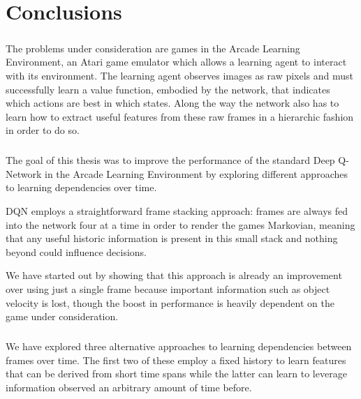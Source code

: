 \chapter{Conclusions}

\paragraph{}
The problems under consideration
are games in the Arcade Learning Environment,
an Atari game emulator
which allows a learning agent to interact
with its environment.
The learning agent observes images as raw pixels
and must successfully learn a value function,
embodied by the network,
that indicates which actions are best in which states.
Along the way the network also has to learn
how to extract useful features
from these raw frames
in a hierarchic fashion
in order to do so.

\paragraph{}
The goal of this thesis was to improve the performance
of the standard Deep Q-Network
in the Arcade Learning Environment
by exploring different approaches
to learning dependencies over time.

DQN employs a straightforward frame stacking approach:
frames are always fed into the network
four at a time
in order to render the games Markovian,
meaning that any useful historic information
is present in this small stack
and nothing beyond could influence decisions.

We have started out by showing that this approach
is already an improvement over
using just a single frame
because important information such as object velocity is lost,
though the boost in performance is heavily dependent
on the game under consideration.

\paragraph{}
We have explored three alternative approaches
to learning dependencies between frames over time.
The first two of these employ a fixed history
to learn features that can be derived from short time spans
while the latter can learn to leverage information
observed an arbitrary amount of time before.

